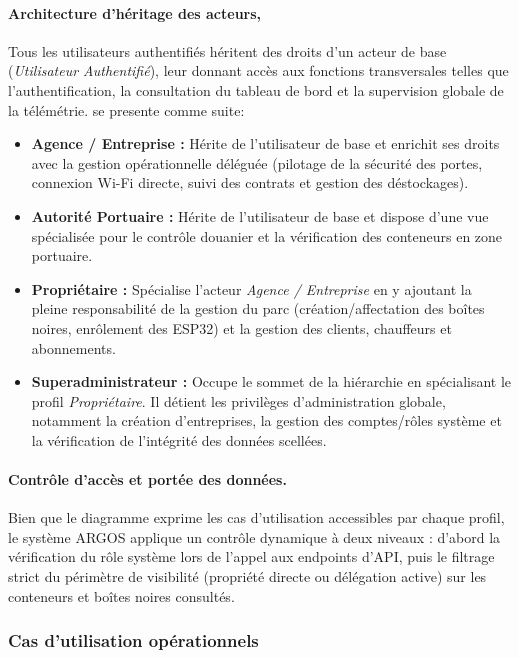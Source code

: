 \paragraph{Architecture d'héritage des acteurs, }
Tous les utilisateurs authentifiés héritent des droits d'un acteur de base (\emph{Utilisateur Authentifié}), leur donnant accès aux fonctions transversales telles que l'authentification, la consultation du tableau de bord et la supervision globale de la télémétrie. se presente comme suite: 
\begin{itemize}
    \item \textbf{Agence / Entreprise :} Hérite de l'utilisateur de base et enrichit ses droits avec la gestion opérationnelle déléguée (pilotage de la sécurité des portes, connexion Wi-Fi directe, suivi des contrats et gestion des déstockages).
    \item \textbf{Autorité Portuaire :} Hérite de l'utilisateur de base et dispose d'une vue spécialisée pour le contrôle douanier et la vérification des conteneurs en zone portuaire.
    \item \textbf{Propriétaire :} Spécialise l'acteur \emph{Agence / Entreprise} en y ajoutant la pleine responsabilité de la gestion du parc (création/affectation des boîtes noires, enrôlement des ESP32) et la gestion des clients, chauffeurs et abonnements.
    \item \textbf{Superadministrateur :} Occupe le sommet de la hiérarchie en spécialisant le profil \emph{Propriétaire}. Il détient les privilèges d'administration globale, notamment la création d'entreprises, la gestion des comptes/rôles système et la vérification de l'intégrité des données scellées.
\end{itemize}

\paragraph{Contrôle d'accès et portée des données.}
Bien que le diagramme exprime les cas d'utilisation accessibles par chaque profil, 
le système ARGOS applique un contrôle dynamique à deux niveaux : 
d'abord la vérification du rôle système lors de l'appel aux endpoints d'API, 
puis le filtrage strict du périmètre de visibilité (propriété directe ou délégation active) sur les conteneurs et boîtes noires consultés.

\subsubsection{Cas d'utilisation opérationnels}

